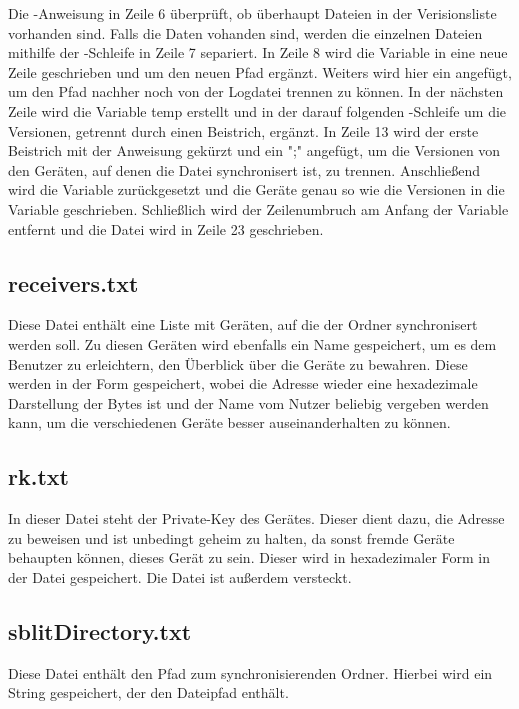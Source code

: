 Die -Anweisung in Zeile 6 überprüft, ob überhaupt Dateien in der Verisionsliste vorhanden sind. Falls die Daten vohanden sind, werden die einzelnen Dateien mithilfe der -Schleife in Zeile 7 separiert. In Zeile 8 wird die  Variable in eine neue Zeile geschrieben und um den neuen Pfad ergänzt. Weiters wird hier ein \code{=} angefügt, um den Pfad nachher noch von der Logdatei trennen zu können. In der nächsten Zeile wird die Variable temp erstellt und in der darauf folgenden -Schleife um die Versionen, getrennt durch einen Beistrich, ergänzt. In Zeile 13 wird der erste Beistrich mit der Anweisung  gekürzt und ein ";" angefügt, um die Versionen von den Geräten, auf denen die Datei synchronisert ist, zu trennen. Anschließend wird die Variable  zurückgesetzt und die Geräte genau so wie die Versionen in die Variable  geschrieben. Schließlich wird der Zeilenumbruch am Anfang der Variable  entfernt und die Datei wird in Zeile 23 geschrieben.

\subsection{receivers.txt} \label{receivers}
Diese Datei enthält eine Liste mit Geräten, auf die der Ordner synchronisert werden soll. Zu diesen Geräten wird ebenfalls ein Name gespeichert, um es dem Benutzer zu erleichtern, den Überblick über die Geräte zu bewahren. Diese werden in der Form  gespeichert, wobei die Adresse wieder eine hexadezimale Darstellung der Bytes ist und der Name vom Nutzer beliebig vergeben werden kann, um die verschiedenen Geräte besser auseinanderhalten zu können.

\subsection{rk.txt}
In dieser Datei steht der Private-Key des Gerätes. Dieser dient dazu, die Adresse zu beweisen und ist unbedingt geheim zu halten, da sonst fremde Geräte behaupten können, dieses Gerät zu sein. Dieser wird in hexadezimaler Form in der Datei gespeichert. Die Datei ist außerdem versteckt.

\subsection{sblitDirectory.txt}
Diese Datei enthält den Pfad zum synchronisierenden Ordner. Hierbei wird ein String gespeichert, der den Dateipfad enthält. 

